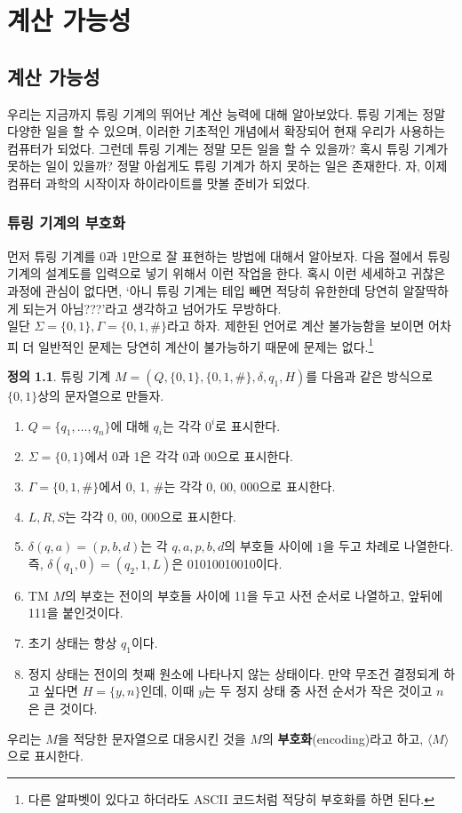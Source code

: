 \documentclass[b5paper, 11pt]{book}
\theoremstyle{definition}
\newtheorem{defn}{정의}[chapter]
\begin{document}
\part{계산 가능성}
\chapter{계산 가능성}
우리는 지금까지 튜링 기계의 뛰어난 계산 능력에 대해 알아보았다. 튜링 기계는 정말 다양한 일을 할 수 있으며,
이러한 기초적인 개념에서 확장되어 현재 우리가 사용하는 컴퓨터가 되었다. 그런데 튜링 기계는 정말 모든 일을
할 수 있을까? 혹시 튜링 기계가 못하는 일이 있을까? 정말 아쉽게도 튜링 기계가 하지 못하는 일은 존재한다.
자, 이제 컴퓨터 과학의 시작이자 하이라이트를 맛볼 준비가 되었다.
\section{튜링 기계의 부호화}
먼저 튜링 기계를 0과 1만으로 잘 표현하는 방법에 대해서 알아보자. 다음 절에서 튜링 기계의 설계도를 
입력으로 넣기 위해서 이런 작업을 한다. 혹시 이런 세세하고 귀찮은 과정에 관심이 없다면, `아니 튜링 기계는
테입 빼면 적당히 유한한데 당연히 알잘딱하게 되는거 아님???'라고 생각하고 넘어가도 무방하다.\\ 
일단 $\Sigma = \{0, 1\}, \Gamma = \{0, 1, \#\}$라고 하자. 제한된 언어로 계산 불가능함을 보이면 어차피 더 일반적인 문제는 당연히 계산이 불가능하기 때문에 문제는 없다.\footnote{다른 알파벳이 있다고 하더라도 ASCII 코드처럼 적당히 부호화를 하면 된다.} \\ 
\begin{defn}\label{TM encoding}
    튜링 기계 $M = (Q, \{0,1\}, \{0, 1, \#\}, \delta, q_1, H)$를 다음과 같은 방식으로
    $\{0,1\}$상의 문자열으로 만들자.
    \begin{enumerate}
        \item $Q = \{q_1, \ldots, q_n\}$에 대해 $q_i$는 각각 $0^i$로 표시한다. 
        \item $\Sigma = \{0,1\}$에서 0과 1은 각각 0과 00으로 표시한다. 
        \item $\Gamma = \{0,1,\#\}$에서 0, 1, \#는 각각 0, 00, 000으로 표시한다.
        \item $L, R, S$는 각각 0, 00, 000으로 표시한다.
        \item $\delta(q,a) = (p, b, d)$는 각 $q,a,p,b,d$의 부호들 사이에 $1$을 두고
        차례로 나열한다. 즉, $\delta(q_1, 0) = (q_2, 1, L)$은 01010010010이다. 
        \item TM $M$의 부호는 전이의 부호들 사이에 11을 두고 사전 순서로 나열하고, 앞뒤에 111을 붙인것이다. 
        \item 초기 상태는 항상 $q_1$이다. 
        \item 정지 상태는 전이의 첫째 원소에 나타나지 않는 상태이다. 만약 무조건 결정되게 하고 싶다면 $H = \{y, n\}$인데, 이때 $y$는 두 정지 상태 중 사전 순서가 작은 것이고 $n$은 큰 것이다.
    \end{enumerate}
    우리는 $M$을 적당한 문자열으로 대응시킨 것을 $M$의 \textbf{부호화}(encoding)라고 하고, $\langle M \rangle$으로 표시한다.
\end{defn}
\end{document}
